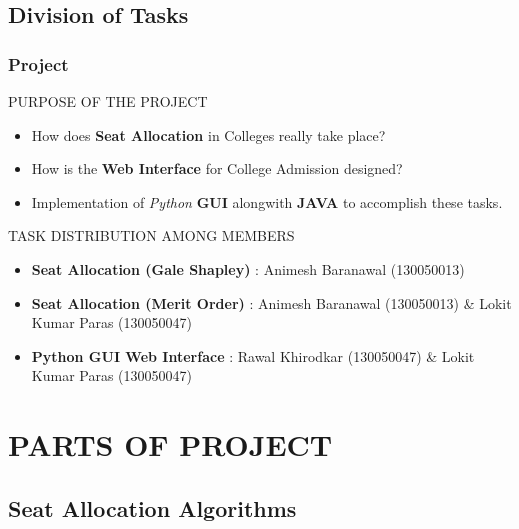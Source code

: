 \documentclass{beamer}
\begin{document}
\subsection{Division of Tasks} %

\begin{frame}
\frametitle{Project}
PURPOSE OF THE PROJECT 
\begin{itemize}
  \item How does \textbf{Seat Allocation} in Colleges really take place? \pause
  \item How is the \textbf{Web Interface} for College Admission designed? \pause
  \item Implementation of {\em Python} \textbf{GUI} alongwith \textbf{JAVA} to accomplish these tasks. \pause
\end{itemize}

TASK DISTRIBUTION AMONG MEMBERS
\begin{itemize}
	\item \textbf{Seat Allocation (Gale Shapley)} : Animesh Baranawal (130050013)
	\item \textbf{Seat Allocation (Merit Order)} : Animesh Baranawal (130050013) \& Lokit Kumar Paras (130050047)
	\item \textbf{Python GUI Web Interface} : Rawal Khirodkar (130050047) \& Lokit Kumar Paras (130050047) 
\end{itemize}
  
\end{frame}

\section{PARTS OF PROJECT} %

\subsection{Seat Allocation Algorithms}
\end{document}
